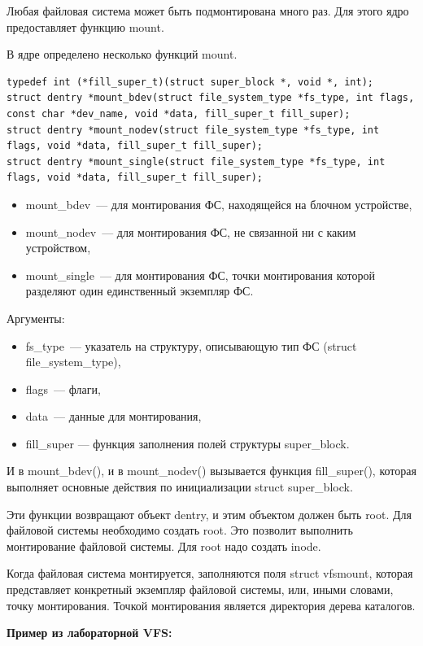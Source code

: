 Любая файловая система может быть подмонтирована много раз. Для этого ядро предоставляет функцию mount.

В ядре определено несколько функций mount.
\begin{lstlisting}
typedef int (*fill_super_t)(struct super_block *, void *, int);
struct dentry *mount_bdev(struct file_system_type *fs_type, int flags, const char *dev_name, void *data, fill_super_t fill_super);
struct dentry *mount_nodev(struct file_system_type *fs_type, int flags, void *data, fill_super_t fill_super);
struct dentry *mount_single(struct file_system_type *fs_type, int flags, void *data, fill_super_t fill_super);
\end{lstlisting}

\begin{itemize}
    \item mount\_bdev — для монтирования ФС, находящейся на блочном устройстве,
    \item mount\_nodev — для монтирования ФС, не связанной ни с каким устройством,
    \item mount\_single — для монтирования ФС, точки монтирования которой разделяют один единственный экземпляр ФС.
\end{itemize}

Аргументы:
\begin{itemize}
    \item fs\_type — указатель на структуру, описывающую тип ФС (struct file\_system\_type),
    \item flags — флаги,
    \item data — данные для монтирования,
    \item fill\_super --- функция заполнения полей структуры super\_block.
\end{itemize}

И в mount\_bdev(), и в mount\_nodev() вызывается функция fill\_super(), которая выполняет основные действия по инициализации struct super\_block.

Эти функции возвращают объект dentry, и этим объектом должен быть root. Для файловой системы необходимо создать root. Это позволит выполнить монтирование файловой системы. Для root надо создать inode.

Когда файловая система монтируется, заполняются поля struct vfsmount, которая представляет конкретный экземпляр файловой системы, или, иными словами, точку монтирования. Точкой монтирования является директория дерева каталогов.

\textbf{Пример из лабораторной VFS:}

